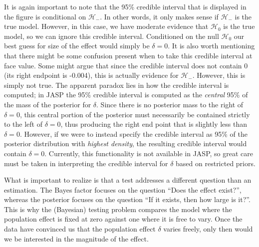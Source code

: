 \documentclass[english,,doc,floatsintext]{apa6}
\begin{document}
It is again important to note that the 95\% credible interval that is displayed in the figure is conditional on \(\mathcal{H}_{-}\). In other words, it only makes sense if \(\mathcal{H}_{-}\) is the true model. However, in this case, we have moderate evidence that \(\mathcal{H}_{0}\) is the true model, so we can ignore this credible interval. Conditioned on the null \(\mathcal{H}_{0}\) our best guess for size of the effect would simply be \(\delta = 0\). It is also worth mentioning that there might be some confusion present when to take this credible interval at face value. Some might argue that since the credible interval does not contain 0 (its right endpoint is -0.004), this is actually evidence for \(\mathcal{H}_{-}\). However, this is simply not true. The apparent paradox lies in how the credible interval is computed; in JASP the 95\% credible interval is computed as the \emph{central} 95\% of the mass of the posterior for \(\delta\). Since there is no posterior mass to the right of \(\delta=0\), this central portion of the posterior must necessarily be contained strictly to the left of \(\delta=0\), thus producing the right end point that is slightly less than \(\delta=0\). However, if we were to instead specify the credible interval as 95\% of the posterior distribution with \emph{highest density}, the resulting credible interval would contain \(\delta=0\). Currently, this functionality is not available in JASP, so great care must be taken in interpreting the credible interval for \(\delta\) based on restricted priors.

What is important to realize is that a test addresses a different question than an estimation. The Bayes factor focuses on the question \enquote{Does the effect exist?}, whereas the posterior focuses on the question \enquote{If it exists, then how large is it?}. This is why the (Bayesian) testing problem compares the model where the population effect is fixed at zero against one where it is free to vary. Once the data have convinced us that the population effect \(\delta\) varies freely, only then would we be interested in the magnitude of the effect.
\end{document}
